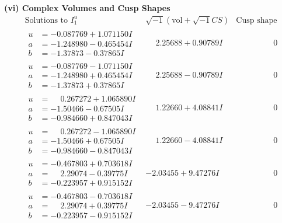 \documentclass[1p]{elsarticle_modified}
\theoremstyle{definition}
\newcommand{\I}{\sqrt{-1}}
\begin{document}
\newpage\flushleft \textbf{(vi) Complex Volumes and Cusp Shapes}
$$\begin{array}{c|c|c}  
\text{Solutions to }I^u_{1}& \I (\text{vol} + \sqrt{-1}CS) & \text{Cusp shape}\\
 \hline 
\begin{aligned}
u &= -0.087769 + 1.071150 I \\
a &= -1.248980 - 0.465454 I \\
b &= -1.37873 - 0.37865 I\end{aligned}
 & \phantom{-}2.25688 + 0.90789 I & \phantom{-0.000000 } 0 \\ \hline\begin{aligned}
u &= -0.087769 - 1.071150 I \\
a &= -1.248980 + 0.465454 I \\
b &= -1.37873 + 0.37865 I\end{aligned}
 & \phantom{-}2.25688 - 0.90789 I & \phantom{-0.000000 } 0 \\ \hline\begin{aligned}
u &= \phantom{-}0.267272 + 1.065890 I \\
a &= -1.50466 - 0.67505 I \\
b &= -0.984660 + 0.847043 I\end{aligned}
 & \phantom{-}1.22660 + 4.08841 I & \phantom{-0.000000 } 0 \\ \hline\begin{aligned}
u &= \phantom{-}0.267272 - 1.065890 I \\
a &= -1.50466 + 0.67505 I \\
b &= -0.984660 - 0.847043 I\end{aligned}
 & \phantom{-}1.22660 - 4.08841 I & \phantom{-0.000000 } 0 \\ \hline\begin{aligned}
u &= -0.467803 + 0.703618 I \\
a &= \phantom{-}2.29074 - 0.39775 I \\
b &= -0.223957 + 0.915152 I\end{aligned}
 & -2.03455 + 9.47276 I & \phantom{-0.000000 } 0 \\ \hline\begin{aligned}
u &= -0.467803 - 0.703618 I \\
a &= \phantom{-}2.29074 + 0.39775 I \\
b &= -0.223957 - 0.915152 I\end{aligned}
 & -2.03455 - 9.47276 I & \phantom{-0.000000 } 0 \\ \hline\begin{aligned}

\end{aligned}
\end{array}$$
\end{document}
